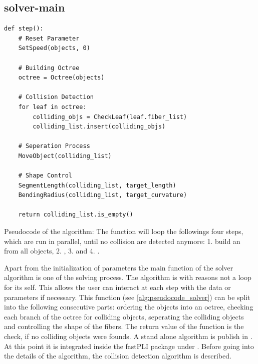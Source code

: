 \subsection{solver-main}
%
\begin{lstfloat}[!tb]
\lstset{style=python}
\begin{lstlisting}[]
def step():
    # Reset Parameter
    SetSpeed(objects, 0)
   
    # Building Octree
    octree = Octree(objects)
   
    # Collision Detection
    for leaf in octree:
        colliding_objs = CheckLeaf(leaf.fiber_list)
        colliding_list.insert(colliding_objs)

    # Seperation Process
    MoveObject(colliding_list)

    # Shape Control
    SegmentLength(colliding_list, target_length)
    BendingRadius(colliding_list, target_curvature)

    return colliding_list.is_empty()
\end{lstlisting}
\caption{Pseudocode of the  algorithm: The function  will loop the followings four steps, which are run in parallel, until no collision are detected anymore: 1. build an  from all objects, 2. , 3.  and 4. . }
\label{alg:pseudocode_solver}
\end{lstfloat}
%
Apart from the initialization of parameters the main function of the solver algorithm is one  of the solving process.
The algorithm is with reasons not a loop for its self. This allows the user can interact at each step with the data or parameters if necessary.
This  function (see \cref{alg:pseudocode_solver}) can be split into the following consecutive parts:
ordering the objects into an octree, checking each branch of the octree for colliding objects, seperating the colliding objects and controlling the shape of the fibers.
The return value of the function is the check, if no colliding objects were founds.
%
A stand alone algorithm is publish in \cite{Matuschke2019}.
At this point it is integrated inside the \ac{fastPLI} package under .
Before going into the details of the algorithm, the collision detection algorithm is described.
%
%
%
